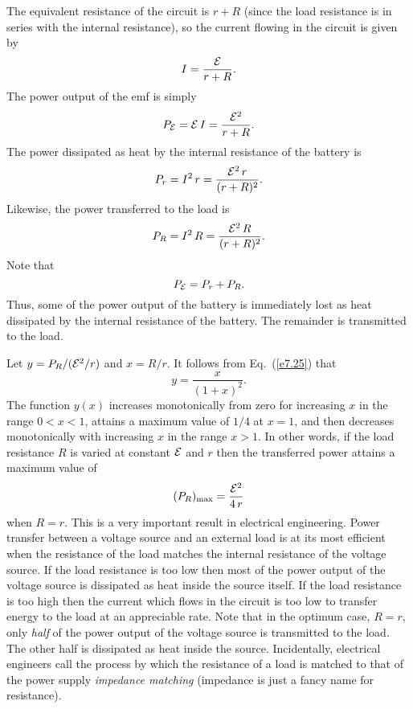 The equivalent resistance of the circuit is $r+R$ (since the load resistance is
in series with the internal resistance), so the current flowing in the
circuit is given by
\begin{equation}
I = \frac{{\cal E}}{r+R}.
\end{equation}
The power output of the emf is simply
\begin{equation}
P_{\cal E} = {\cal E}\,I = \frac{{\cal E}^2}{r+R}.
\end{equation}
The power dissipated as heat by the internal resistance of the battery is
\begin{equation}
P_r = I^2\,r = \frac{ {\cal E}^2\,r}{(r+R)^2}.
\end{equation}
Likewise, the power transferred to the load is
\begin{equation}\label{e7.25}
P_R = I^2\,R = \frac{ {\cal E}^2\,R}{(r+R)^2}.
\end{equation}
Note that 
\begin{equation}
P_{\cal E} =P_r + P_R.
\end{equation}
Thus, some of the power output of the battery is immediately lost as heat dissipated by the
internal resistance of the battery. The remainder is transmitted to the load. 

Let $y = P_R/({\cal E}^2/r)$ and $x=R/r$. It follows from
Eq.~(\ref{e7.25}) that
\begin{equation}
y = \frac{x}{(1+x)^2}.
\end{equation}
The function $y(x)$ increases monotonically from zero for 
increasing $x$ in the range $0<x<1$, attains
a maximum value of $1/4$ at $x=1$, and then decreases monotonically with increasing
$x$ in the range $x>1$. In other words, if the load resistance $R$ is varied at
constant ${\cal E}$ and $r$ then the transferred power attains a maximum
value of 
\begin{equation}
(P_R)_{\rm max} = \frac{{\cal E}^2}{4 \,r}
\end{equation}
when $R=r$. This is a very important result in electrical engineering.
Power transfer between a voltage source and an external load is at its most efficient when the
resistance of the load matches the internal resistance of the voltage source.
If the load resistance is too low then most of the power output of the voltage
source is dissipated as heat inside the source itself. If the load resistance
is too high then the current which flows in the circuit is too low to
transfer energy to the load at an appreciable rate. Note that in the optimum case,
$R=r$, only {\em half}\/ of the power output of the voltage source
is transmitted to the load. The other half is dissipated as heat inside
the source. 
 Incidentally, electrical engineers call the process by which the resistance of
a load is matched to that of the power supply {\em impedance matching}\/
(impedance is just a fancy name for resistance).

